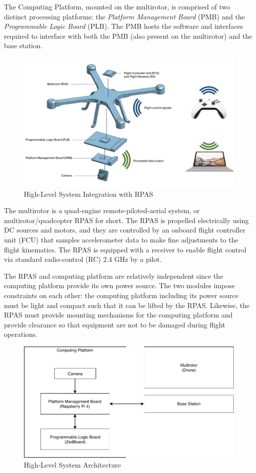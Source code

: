 The Computing Platform, mounted on the multirotor, is comprised of two distinct processing platforms: the \textit{Platform Management Board} (PMB) and the \textit{Programmable Logic Board} (PLB). The PMB hosts the software and interfaces required to interface with both the PMB (also present on the multirotor) and the base station.

\begin{figure}[H]\label{hlpic}
    \centering
    \includegraphics[width=\linewidth]{img/intpic}
\caption{High-Level System Integration with RPAS}
\end{figure}

The multirotor is a quad-engine remote-piloted-aerial system, or multirotor/quadcopter RPAS for short.
The RPAS is propelled electrically using DC sources and motors, and they are controlled by an onboard flight controller unit (FCU) that samples accelerometer data to make fine adjustments to the flight kinematics.
The RPAS is equipped with a receiver to enable flight control via standard radio-control (RC) 2.4 GHz by a pilot.

The RPAS and computing platform are relatively independent since the computing platform provide its own power source. The two modules impose constraints on each other: the computing platform including its power source must be light and compact such that it can be lifted by the RPAS. 
Likewise, the RPAS must provide mounting mechanisms for the computing platform and provide clearance so that equipment are not to be damaged during flight operations.

\begin{figure}[H]\label{hldiag}
\centering
\includegraphics[width=15cm]{img/highlevel.pdf}
\caption{High-Level System Architecture}
\end{figure}

